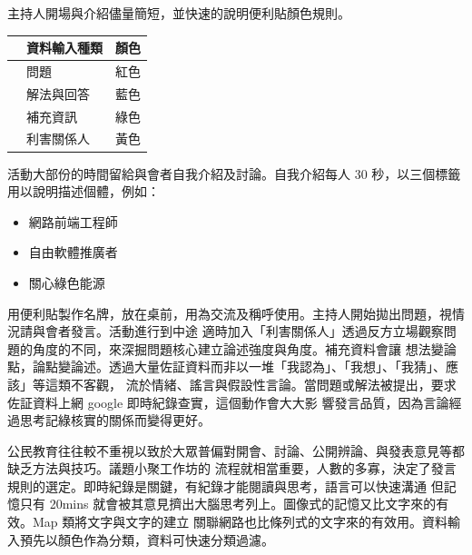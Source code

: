 \documentclass[12pt,a4paper]{article}
\begin{document}
\begin{enumerate}
\begin{enumerate}
主持人開場與介紹儘量簡短，並快速的說明便利貼顏色規則。

\begin{center}
\label{tab:orgf8fb2a8}
\begin{tabular}{lll}
\toprule
 & 資料輸入種類 & 顏色\\
\midrule
 & 問題 & 紅色\\
 & 解法與回答 & 藍色\\
 & 補充資訊 & 綠色\\
 & 利害關係人 & 黃色\\
\bottomrule
\end{tabular}
\end{center}

活動大部份的時間留給與會者自我介紹及討論。自我介紹每人 30 秒，以三個標籤用以說明描述個體，例如：

\begin{itemize}
\item 網路前端工程師
\item 自由軟體推廣者
\item 關心綠色能源
\end{itemize}

用便利貼製作名牌，放在桌前，用為交流及稱呼使用。主持人開始拋出問題，視情況請與會者發言。活動進行到中途
適時加入「利害關係人」透過反方立場觀察問題的角度的不同，來深掘問題核心建立論述強度與角度。補充資料會讓
想法變論點，論點變論述。透過大量佐証資料而非以一堆「我認為」、「我想」、「我猜」、應該」等這類不客觀，
流於情緒、謠言與假設性言論。當問題或解法被提出，要求佐証資料上網 google 即時紀錄查實，這個動作會大大影
響發言品質，因為言論經過思考記綠核實的關係而變得更好。

公民教育往往較不重視以致於大眾普偏對開會、討論、公開辨論、與發表意見等都缺乏方法與技巧。議題小聚工作坊的
流程就相當重要，人數的多寡，決定了發言規則的選定。即時紀錄是關鍵，有紀錄才能閱讀與思考，語言可以快速溝通
但記憶只有 20mins 就會被其意見擠出大腦思考列上。圖像式的記憶又比文字來的有效。Map 類將文字與文字的建立
關聯網路也比條列式的文字來的有效用。資料輸入預先以顏色作為分類，資料可快速分類過濾。


\end{enumerate}
\end{enumerate}
\end{document}
